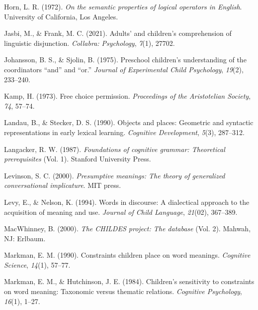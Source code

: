 \documentclass[
  ,man,floatsintext]{apa6}
\newlength{\cslhangindent}
\newlength{\cslentryspacingunit} %
\newenvironment{CSLReferences}[2] %
 {%
  \setlength{\parindent}{0pt}
  \ifodd #1
  \let\oldpar\par
  \def\par{\hangindent=\cslhangindent\oldpar}
  \fi
  \setlength{\parskip}{#2\cslentryspacingunit}
 }%
 {}
\begin{document}
\begin{CSLReferences}{1}{0}
\leavevmode{}%
Horn, L. R. (1972). \emph{On the semantic properties of logical operators in {E}nglish}. University of California, Los Angeles.

\leavevmode{}%
Jasbi, M., \& Frank, M. C. (2021). Adults' and children's comprehension of linguistic disjunction. \emph{Collabra: Psychology}, \emph{7}(1), 27702.

\leavevmode{}%
Johansson, B. S., \& Sjolin, B. (1975). Preschool children's understanding of the coordinators {``and''} and {``or.''} \emph{Journal of Experimental Child Psychology}, \emph{19}(2), 233--240.

\leavevmode{}%
Kamp, H. (1973). Free choice permission. \emph{Proceedings of the {A}ristotelian Society}, \emph{74}, 57--74.

\leavevmode{}%
Landau, B., \& Stecker, D. S. (1990). Objects and places: Geometric and syntactic representations in early lexical learning. \emph{Cognitive Development}, \emph{5}(3), 287--312.

\leavevmode{}%
Langacker, R. W. (1987). \emph{Foundations of cognitive grammar: Theoretical prerequisites} (Vol. 1). {S}tanford {U}niversity {P}ress.

\leavevmode{}%
Levinson, S. C. (2000). \emph{Presumptive meanings: The theory of generalized conversational implicature}. MIT press.

\leavevmode{}%
Levy, E., \& Nelson, K. (1994). Words in discourse: A dialectical approach to the acquisition of meaning and use. \emph{Journal of Child Language}, \emph{21}(02), 367--389.

\leavevmode{}%
MacWhinney, B. (2000). \emph{The {CHILDES} project: The database} (Vol. 2). Mahwah, NJ: Erlbaum.

\leavevmode{}%
Markman, E. M. (1990). Constraints children place on word meanings. \emph{Cognitive Science}, \emph{14}(1), 57--77.

\leavevmode{}%
Markman, E. M., \& Hutchinson, J. E. (1984). Children's sensitivity to constraints on word meaning: Taxonomic versus thematic relations. \emph{Cognitive Psychology}, \emph{16}(1), 1--27.


\end{CSLReferences}
\end{document}
